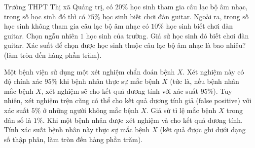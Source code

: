 \begin{bt}%
	 Trường THPT Thị xã Quảng trị, có $20\%$ học sinh tham gia câu lạc bộ âm nhạc, trong số học sinh đó thì có $75\%$ học sinh biết chơi đàn guitar. Ngoài ra, trong số học sinh không tham gia câu lạc bộ âm nhạc có $10\%$ học sinh biết chơi đàn guitar. Chọn ngẫu nhiên $1$ học sinh của trường. Giả sử học sinh đó biết chơi đàn guitar. Xác suất để chọn được học sinh thuộc câu lạc bộ âm nhạc là bao nhiêu? (làm tròn đến hàng phần trăm).
\end{bt}

\begin{bt}%
	Một bệnh viện sử  dụng một xét nghiệm chẩn đoán bệnh $X$. Xét nghiệm này có độ chính xác $95 \%$ khi bệnh nhân thực sự mắc bệnh $X$ (tức là, nếu bệnh nhân mắc bệnh $X$, xét nghiệm sẽ cho kết quả dương tính với xác suất $95\%$). Tuy nhiên, xét nghiệm trện cũng có thể cho kết quả dương tính giả (false positive) với xác suất $5\%$ ở những người không mắc bệnh $X$. Giả sử tỉ lệ mắc bệnh $X$ trong dân số là $1\%$. Khi một bệnh nhân được xét nghiệm và cho kết quả dương tính. Tính xác suất bệnh nhân này thực sự mắc bệnh $X$ (kết quả được ghi dưới dạng số thập phân, làm tròn đến hàng phần trăm).
\end{bt}

